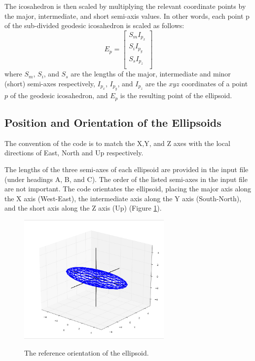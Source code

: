 \documentclass[11pt]{article}
\begin{document}
The icosahedron is then scaled by multiplying the relevant coordinate points by the major, intermediate, and short semi-axis values. In other words, each point p of the sub-divided geodesic icosahedron is scaled as follows:
\begin{equation}
  E_p = 
  \begin{bmatrix}
    S_m I_{p_x} \\
    S_i I_{p_y} \\
    S_s I_{p_z} \\
  \end{bmatrix}
\end{equation}
where $S_m$, $S_i$, and $S_s$ are the lengths of the major, intermediate and minor (short) semi-axes respectively, $I_{p_x}$, $I_{p_y}$, and $I_{p_z}$ are the $xyz$ coordinates of a point $p$ of the geodesic icosahedron, and $E_p$ is the resulting point of the ellipsoid.

\subsection{Position and Orientation of the Ellipsoids}

The convention of the code is to match the X,Y, and Z axes with the local directions of East, North and Up respectively.

The lengths of the three semi-axes of each ellipsoid are provided in the input file (under headings A, B, and C). The order of the listed semi-axes in the input file are not important. The code orientates the ellipsoid, placing the major axis along the X axis (West-East), the intermediate axis along the Y axis (South-North), and the short axis along the Z axis (Up) (Figure \ref{fig:ellipsoids1}).
\begin{figure}[h!]
  \caption{The reference orientation of the ellipsoid.}
  \centering
    \includegraphics[width=7.5cm]{ellipsoids1}
    \label{fig:ellipsoids1}
\end{figure}
\end{document}
